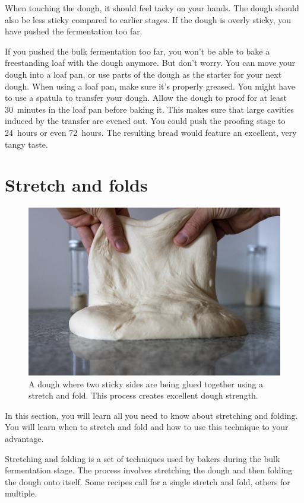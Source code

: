 When touching the dough, it should feel tacky
on your hands. The dough should also be less sticky
compared to earlier stages. If the dough is overly
sticky, you have pushed the fermentation too far.

If you pushed the bulk fermentation too far, you won't be able
to bake a freestanding loaf with the dough anymore. But don't
worry. You can move your dough into a loaf pan, or use parts
of the dough as the starter for your next dough. When using
a loaf pan, make sure it's properly greased. You might have
to use a spatula to transfer your dough. Allow the dough
to proof for at least 30~minutes in the loaf pan before
baking it. This makes sure that large cavities induced
by the transfer are evened out. You could push the proofing
stage to 24~hours or even 72~hours. The resulting
bread would feature an excellent, very tangy taste.


\section{Stretch and folds}

\begin{figure}[!htb]
  \centering
  \includegraphics[width=\textwidth]{dough-being-glued}
  \caption[Gluing dough]{A dough where two sticky sides are being glued
      together using a stretch and fold. This process creates excellent dough
      strength.}
\end{figure}

In this section, you will learn all you need to know about stretching and
folding. You will learn when to stretch and fold and how to use this technique
to your advantage.

Stretching and folding is a set of techniques used by bakers during the bulk
fermentation stage. The process involves stretching the dough and then
folding the dough onto itself. Some recipes call for a single stretch
and fold, others for multiple.

